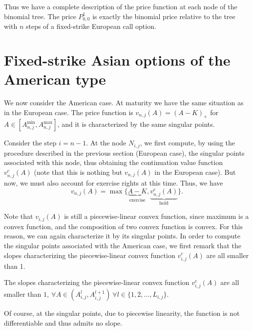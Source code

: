 Thus we have a complete description of the price function at each node of the binomial tree. The price $ P_{0,0}^1 $ is exactly the binomial price relative to the tree with $n$ steps of a fixed-strike European call option.


\section{Fixed-strike Asian options of the American type}
\label{sec:fixed-strike-am}

We now consider the American case. At maturity we have the same situation as in the European case. The price function is $ v_{n,j} (A) = (A - K)_+ $ for $ A \in [ A_{n,j}^{\min}, A_{n,j}^{\max} ] $, and it is characterized by the same singular points.

Consider the step $ i = n - 1 $. At the node $ N_{i,j} $, we first compute, by using the procedure described in the previous section (European case), the singular points associated with this node, thus obtaining the continuation value function $ v_{n,j}^c (A) $ (note that this is nothing but $ v_{n,j} (A) $ in the European case). But now, we must also account for exercise rights at this time. Thus, we have
\begin{equation}
	v_{n,j} (A)  =  \max \{ \underbrace{A - K}_{\text{exercise}}, \underbrace{v_{n,j}^c (A)}_{\text{hold}} \} .
\end{equation}

Note that $ v_{i,j} (A) $ is still a piecewise-linear convex function, since maximum is a convex function, and the composition of two convex function is convex. For this reason, we can again characterize it by its singular points. In order to compute the singular points associated with the American case, we first remark that the slopes characterizing the piecewise-linear convex function $ v_{i,j}^c (A) $ are all smaller than 1.


\begin{prp}
	The slopes characterizing the piecewise-linear convex function $ v_{i,j}^c (A) $ are all smaller than $ 1, \  \forall A \in \left(  A_{i,j}^{l}, A_{i,j}^{l+1}  \right)  \  \forall l \in \{ 1, 2, \dots, L_{i,j} \} $.
\end{prp}

Of course, at the singular points, due to piecewise linearity, the function is not differentiable and thus admits no slope.

